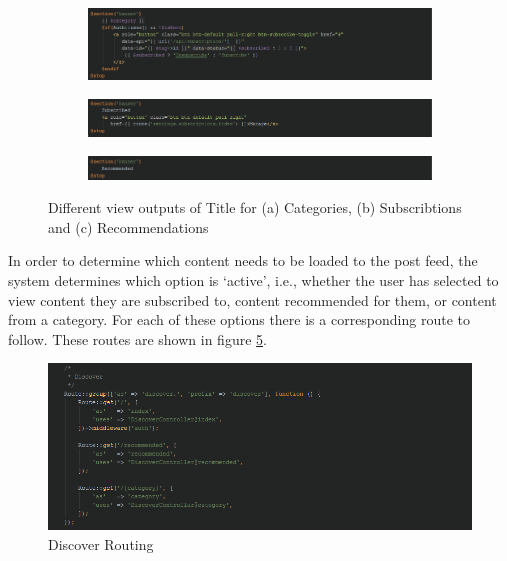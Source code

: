 \begin{figure}[H]
\centering
\begin{subfigure}[b]{1\linewidth}
	\includegraphics[width=\textwidth]{Images/Implementation/CategoryBladePhp}
	\caption{}
	\label{fig:CategoryBladePhp}
\end{subfigure}
\begin{subfigure}[b]{1\linewidth}
	\includegraphics[width=\textwidth]{Images/Implementation/IndexBladePhp}
	\caption{}
	\label{fig:IndexBladePhp}
\end{subfigure}
\begin{subfigure}[b]{1\linewidth}
	\includegraphics[width=\textwidth]{Images/Implementation/RecommendedBladePhp}
	\caption{}
	\label{fig:RecommendedBladePhp}
\end{subfigure}
\caption{Different view outputs of Title for (a) Categories, (b) Subscribtions and (c) Recommendations}
\label{fig:DiscoverTitle}
\end{figure}

In order to determine which content needs to be loaded to the post feed, the system determines which option is `active', i.e., whether the user has selected to view content they are subscribed to, content recommended for them, or content from a category. For each of these options there is a corresponding route to follow. These routes are shown in figure \ref{fig:DiscoverRouting}.

\begin{figure}[H]
\centering
\includegraphics[width=\textwidth]{Images/Implementation/DiscoverRouting}
\caption{Discover Routing}
\label{fig:DiscoverRouting}
\end{figure}

